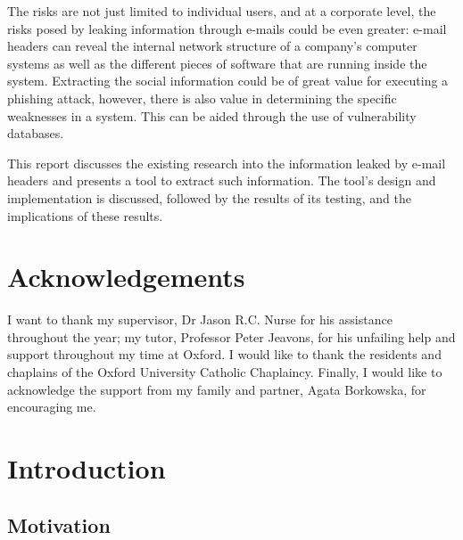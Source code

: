 \documentclass[a4paper,DIV=12,BCOR=7mm,abstract=yes,twoside,11pt]{scrreprt}
\begin{document}
The risks are not just limited to individual users, and at a corporate level,
the risks posed by leaking information through e-mails could be even greater:
e-mail headers can reveal the internal network structure of a company's
computer systems as well as the different pieces of software that are running
inside the system.  Extracting the social information could be of great value
for executing a phishing attack, however, there is also value in determining
the specific weaknesses in a system.  This can be aided through the use of
vulnerability databases.

This report discusses the existing research into the information leaked by
e-mail headers and presents a tool to extract such information.  The tool's
design and implementation is discussed, followed by the results of its testing,
and the implications of these results.

\cleardoublepage 
\chapter*{Acknowledgements}

I want to thank my supervisor, Dr Jason R.C. Nurse for his assistance
throughout the year; my tutor, Professor Peter Jeavons, for his unfailing help
and support throughout my time at Oxford.  I would like to thank the residents
and chaplains of the Oxford University Catholic Chaplaincy.  Finally, I would
like to acknowledge the support from my family and partner, Agata Borkowska,
for encouraging me.

\cleardoublepage 
\tableofcontents 
\clearpage
\let\LaTeXStandardClearpage\clearpage
\let\clearpage\relax  %

\listoftables \listoffigures \listofalgorithms

\let\clearpage\LaTeXStandardClearpage %


\cleardoublepage 
\chapter{Introduction}\label{chap:int}
\setcounter{page}{1}

\section{Motivation}
\end{document}
